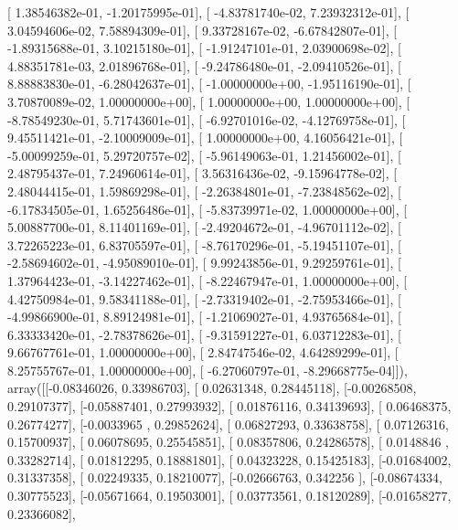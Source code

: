 \documentclass{article}
\begin{document}
       [  1.38546382e-01,  -1.20175995e-01],
       [ -4.83781740e-02,   7.23932312e-01],
       [  3.04594606e-02,   7.58894309e-01],
       [  9.33728167e-02,  -6.67842807e-01],
       [ -1.89315688e-01,   3.10215180e-01],
       [ -1.91247101e-01,   2.03900698e-02],
       [  4.88351781e-03,   2.01896768e-01],
       [ -9.24786480e-01,  -2.09410526e-01],
       [  8.88883830e-01,  -6.28042637e-01],
       [ -1.00000000e+00,  -1.95116190e-01],
       [  3.70870089e-02,   1.00000000e+00],
       [  1.00000000e+00,   1.00000000e+00],
       [ -8.78549230e-01,   5.71743601e-01],
       [ -6.92701016e-02,  -4.12769758e-01],
       [  9.45511421e-01,  -2.10009009e-01],
       [  1.00000000e+00,   4.16056421e-01],
       [ -5.00099259e-01,   5.29720757e-02],
       [ -5.96149063e-01,   1.21456002e-01],
       [  2.48795437e-01,   7.24960614e-01],
       [  3.56316436e-02,  -9.15964778e-02],
       [  2.48044415e-01,   1.59869298e-01],
       [ -2.26384801e-01,  -7.23848562e-02],
       [ -6.17834505e-01,   1.65256486e-01],
       [ -5.83739971e-02,   1.00000000e+00],
       [  5.00887700e-01,   8.11401169e-01],
       [ -2.49204672e-01,  -4.96701112e-02],
       [  3.72265223e-01,   6.83705597e-01],
       [ -8.76170296e-01,  -5.19451107e-01],
       [ -2.58694602e-01,  -4.95089010e-01],
       [  9.99243856e-01,   9.29259761e-01],
       [  1.37964423e-01,  -3.14227462e-01],
       [ -8.22467947e-01,   1.00000000e+00],
       [  4.42750984e-01,   9.58341188e-01],
       [ -2.73319402e-01,  -2.75953466e-01],
       [ -4.99866900e-01,   8.89124981e-01],
       [ -1.21069027e-01,   4.93765684e-01],
       [  6.33333420e-01,  -2.78378626e-01],
       [ -9.31591227e-01,   6.03712283e-01],
       [  9.66767761e-01,   1.00000000e+00],
       [  2.84747546e-02,   4.64289299e-01],
       [  8.25755767e-01,   1.00000000e+00],
       [ -6.27060797e-01,  -8.29668775e-04]]), array([[-0.08346026,  0.33986703],
       [ 0.02631348,  0.28445118],
       [-0.00268508,  0.29107377],
       [-0.05887401,  0.27993932],
       [ 0.01876116,  0.34139693],
       [ 0.06468375,  0.26774277],
       [-0.0033965 ,  0.29852624],
       [ 0.06827293,  0.33638758],
       [ 0.07126316,  0.15700937],
       [ 0.06078695,  0.25545851],
       [ 0.08357806,  0.24286578],
       [ 0.0148846 ,  0.33282714],
       [ 0.01812295,  0.18881801],
       [ 0.04323228,  0.15425183],
       [-0.01684002,  0.31337358],
       [ 0.02249335,  0.18210077],
       [-0.02666763,  0.342256  ],
       [-0.08674334,  0.30775523],
       [-0.05671664,  0.19503001],
       [ 0.03773561,  0.18120289],
       [-0.01658277,  0.23366082],
\end{document}
